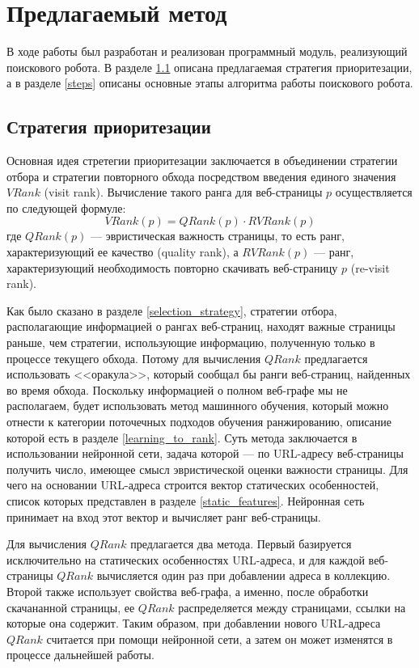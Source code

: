 \chapter{Предлагаемый метод}
\label{chapter_method}

В ходе работы был разработан и реализован программный модуль, реализующий поискового робота. В разделе \ref{strategy} описана предлагаемая стратегия приоритезации, а в разделе \ref{steps} описаны основные этапы алгоритма работы поискового робота.

\section{Стратегия приоритезации}
\label{strategy}

Основная идея стретегии приоритезации заключается в объединении стратегии отбора и стратегии повторного обхода посредством введения единого значения $VRank$ (visit rank). Вычисление такого ранга для веб-страницы $p$ осуществляется по следующей формуле:
$$VRank(p) = QRank(p) \cdot RVRank(p)$$
где $QRank(p)$ --- эвристическая важность страницы, то есть ранг, характеризующий ее качество (quality rank), а $RVRank(p)$ --- ранг, характеризующий необходимость повторно скачивать веб-страницу $p$ (re-visit rank). 

Как было сказано в разделе \ref{selection_strategy}, стратегии отбора, располагающие информацией о рангах веб-страниц, находят важные страницы раньше, чем стратегии, использующие информацию, полученную только в процессе текущего обхода. Потому для вычисления $QRank$ предлагается использовать <<оракула>>, который сообщал бы ранги веб-страниц, найденных во время обхода. Поскольку информацией о полном веб-графе мы не располагаем, будет использовать метод машинного обучения, который можно отнести к категории поточечных подходов обучения ранжированию, описание которой есть в разделе \ref{learning_to_rank}. Суть метода заключается в использовании нейронной сети, задача которой --- по URL-адресу веб-страницы получить число, имеющее смысл эвристической оценки важности страницы. Для чего на основании URL-адреса строится вектор статических особенностей, список которых представлен в разделе \ref{static_features}. Нейронная сеть принимает на вход этот вектор и вычисляет ранг веб-страницы.

Для вычисления $QRank$ предлагается два метода. Первый базируется исключительно на статических особенностях URL-адреса, и для каждой веб-страницы $QRank$ вычисляется один раз при добавлении адреса в коллекцию. Второй также использует свойства веб-графа, а именно, после обработки скачананной страницы, ее $QRank$ распределяется между страницами, ссылки на которые она содержит. Таким образом, при добавлении нового URL-адреса $QRank$ считается при помощи нейронной сети, а затем он может изменятся в процессе дальнейшей работы.

